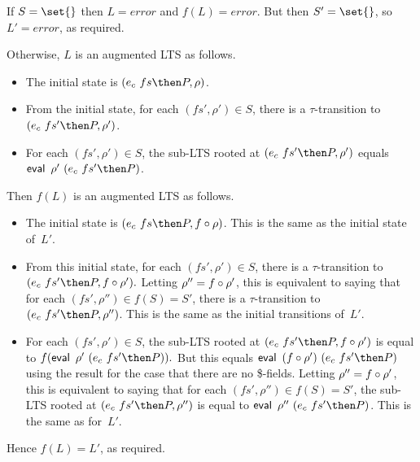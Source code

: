If $S = \set{}$ then $L = error$ and $f(L) = error$.  But then $S' =
\set{}$, so $L' = error$, as required. 

Otherwise, $L$ is an augmented LTS as follows.
\begin{itemize}
\item The initial state is $(e_c~fs \then P, \rho)$.

\item From the initial state, for each $(fs',\rho') \in S$, there is a
  $\tau$-transition to $(e_c~fs' \then P, \rho')$.

\item For each $(fs',\rho') \in S$, the sub-LTS rooted at
  $(e_c~fs' \then P, \rho')$ equals $\eval~\rho'~(e_c~fs' \then P)$.
\end{itemize}

%
Then $f(L)$ is an augmented LTS as follows.
\begin{itemize}
\item The initial state is
  $(e_c~fs \then P, f\after\rho)$.  This is the
  same as the initial state of~$L'$.

\item From this initial state, for each $(fs',\rho') \in S$, there is a
  $\tau$-transition to
  \(
  (e_c~fs' \then P, f\after\rho'). 
  \)
  Letting $\rho'' = f\circ\rho'$, this is equivalent to
  saying that for each $(fs',\rho'') \in f(S) = S'$, there is a
  $\tau$-transition to $(e_c~fs' \then P,\linebreak[1] \rho'')$.
  This is the same as the initial transitions of~$L'$.

\item For each $(fs',\rho') \in S$, the sub-LTS rooted at
  $(e_c~fs' \then  P,\linebreak[2]
    {f\after\rho'})$ is 
  equal to 
  \( f(\eval~\rho'~(e_c~fs' \then P)) . \)
  But this equals $\eval~{(f\after\rho')} ~ (e_c~fs' \then P)$
  using the result for the case that there are no \$-fields.
  Letting 
  $\rho'' = f\circ\rho'$, this is equivalent to saying that for each
  $(fs',\rho'') \in f(S) = S'$, the sub-LTS rooted at
  $(e_c~fs' \then P, \linebreak[2] \rho'')$ is equal to
  $\eval~\rho''~(e_c~fs' \then P)$.  This is the same as for~$L'$.
\end{itemize}
%
Hence $f(L) = L'$, as required.



